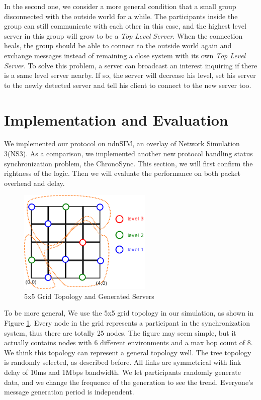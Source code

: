 \documentclass[conference]{IEEEtran}
\begin{document}
In the second one,
we consider a more general condition that a small group disconnected
with the outside world for a while.
The participants inside the group can still communicate with each other in this case,
and the highest level server in this group will grow to be a \emph{Top Level Server}.
When the connection heals,
the group should be able to connect to the outside world again and
exchange messages instead of remaining a close system with its own \emph{Top Level Server}.
To solve this problem, a server can broadcast an interest inquiring if there is a same level server nearby.
If so, the server will decrease his level,
set his server to the newly detected server and tell his client to connect to the new server too.

\section{Implementation and Evaluation}
\label{implementation}
We implemented our protocol on ndnSIM,
an overlay of Network Simulation 3(NS3)\cite{ns3}.
As a comparison, we implemented another new protocol handling status synchronization problem,
the ChronoSync. This section, we will first confirm the rightness of the logic.
Then we will evaluate the performance on both packet overhead and delay.

\begin{figure}[!t]
\centering
\includegraphics[width=2.5in]{../png/paper-topo.png}
\caption{5x5 Grid Topology and Generated Servers}
\label{paper_topo}
\end{figure}
To be more general, We use the 5x5 grid topology in our simulation,
as shown in Figure \ref{paper_topo}.
Every node in the grid represents a participant in the synchronization system,
thus there are totally 25 nodes.
The figure may seem simple,
but it actually contains nodes with 6 different environments and a max hop count of 8.
We think this topology can represent a general topology well.
The tree topology is randomly selected, as described before.
All links are symmetrical with link delay of 10ms and 1Mbps bandwidth.
We let participants randomly generate data,
and we change the frequence of the generation to see the trend.
Everyone's message generation period is independent.
\end{document}
